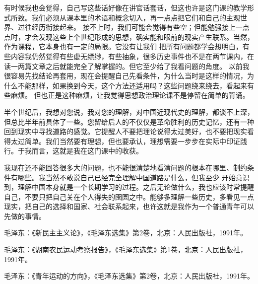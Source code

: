 \documentclass[12pt,a4paper]{ctexart}
\begin{document}
{有时候我也会觉得，自己写这些话好像在讲官话套话，但这也许是这门课的教学形式所致。我们必须从课本里的术语和概念切入，再一点点把它们和自己的主观世界、过往经历衔接起来。
接不上时，我们可能会觉得有些空；但能勉强接上一点点时，才会发现这些上个世纪形成的思想，确实能和眼前的现实产生联系。当然，作为课程，它本身也有一定的局限。它没有让我们
把所有问题都学会想明白，有些内容我仍然觉得有些虚无缥缈，有些抽象，很多历史事件也不是在两节课内，在读一两篇文章之后就能完全了解掌握的。但它至少给了我看问题的角度。
以前我很容易先找结论再套用，现在会提醒自己先看条件，为什么当时是这样的情况，为什么不能那样，如果换到今天，这个方法还适用吗？这些问题绕来绕去，看起来有些麻烦。
但也正是这种麻烦，让我觉得思想政治理论课不是停留在简单的背诵。

半个世纪后，我想对您说，我对您的理解，对中国近现代史的理解，都谈不上深，但总比半年前具体了一些。您留给后人的不仅仅是革命胜利的历史记忆，还有一种回到现实中寻找道路的感觉。它提醒人不要把理论说得太过美好，也不要把现实看得太过简单。我们当然要有理想，但也要承认，理想需要一步步在实际中印证践行。于我而言，这就是我在这门课中的收获。

我现在还不能回答很多大的问题，也不能很清楚地看清问题的根本在哪里、制约条件有哪些。我当然不敢说自己已经完全理解中国道路是什么，但我至少
开始意识到，理解中国本身就是一个长期学习的过程。之后无论做什么，我也应该时常提醒自己，不要只把自己关在个人得失的囹圄之中。能够多理解一些历史，多看见一点
现实，把自己的选择和国家、社会联系起来，也许这就是我作为一个普通青年可以先做的事情。

\vspace{1em}

\noindent [1] 毛泽东：《新民主主义论》，《毛泽东选集》第2卷，北京：人民出版社，1991年。

\noindent [2] 毛泽东：《湖南农民运动考察报告》，《毛泽东选集》第1卷，北京：人民出版社，1991年。

\noindent [3] 毛泽东：《青年运动的方向》，《毛泽东选集》第2卷，北京：人民出版社，1991年。

}
\end{document}
